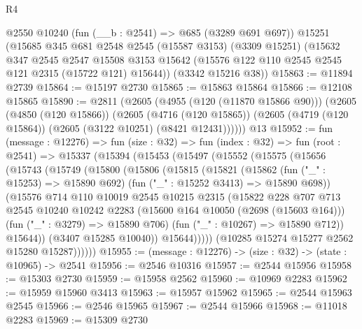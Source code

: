 \begin{lexlean}{R4}
\begin{coremodule}
    @2550
    @10240
    (fun (__b : @2541) => @685 (@3289 @691 @697))
    @15251
    (@15685
      @345
      @681
      @2548
      @2545
      (@15587 @3153)
      (@3309 @15251)
      (@15632
        @347
        @2545
        @2547
        @15508
        @3153
        @15642
        (@15576 @122 @110 @2545 @2545 @121 @2315 (@15722 @121) @15644))
      (@3342 @15216 @38))
@15863 := @11894 @2739
@15864 := @15197 @2730
@15865 := @15863 @15864
@15866 := @12108 @15865
@15890 := @2811
    (@2605
      (@4955 (@120 (@11870 @15866 @90)))
      (@2605
        (@4850 (@120 @15866))
        (@2605
          (@4716 (@120 @15865))
          (@2605 (@4719 (@120 @15864)) (@2605 (@3122 @10251) (@8421 @12431))))))
    @13
@15952 := fun (message : @12276) =>
  fun (size : @32) =>
  fun (index : @32) =>
  fun (root : @2541) =>
  @15337
    (@15394
      (@15453
        (@15497
          (@15552
            (@15575
              (@15656
                (@15743
                  (@15749
                    (@15800
                      (@15806
                        (@15815
                          (@15821
                            (@15862
                              (fun ("_" : @15253) => @15890 @692)
                              (fun ("_" : @15252 @3413) => @15890 @698))
                            (@15576
                              @714
                              @110
                              @10019
                              @2545
                              @10215
                              @2315
                              (@15822
                                @228
                                @707
                                @713
                                @2545
                                @10240
                                @10242
                                @2283
                                (@15600 @164 @10050 (@2698 (@15603 @164)))
                                (fun ("_" : @3279) => @15890 @706)
                                (fun ("_" : @10267) => @15890 @712))
                              @15644))
                          (@3407 @15285 @10040))
                        @15644)))))
              (@10285 @15274 @15277 @2562 @15280 @15287))))))
@15955 := (message : @12276) -> (size : @32) -> (state : @10965) -> @2541
@15956 := @2546 @10316
@15957 := @2544 @15956
@15958 := @15303 @2730
@15959 := @15958 @2562
@15960 := @10969 @2283
@15962 := @15959 @15960 @3413
@15963 := @15957 @15962
@15965 := @2544 @15963 @2545
@15966 := @2546 @15965
@15967 := @2544 @15966
@15968 := @11018 @2283
@15969 := @15309 @2730

\end{coremodule}
\end{lexlean}
